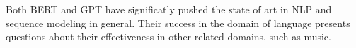 Both BERT and GPT have significatly pushed the state of art in NLP and sequence modeling in general. Their success in the domain of language presents questions about their effectiveness in other related domains, such as music. 





